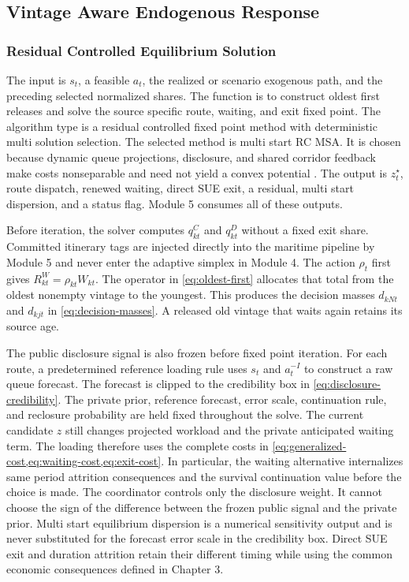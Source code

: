 \documentclass[a4paper,fleqn]{cas-sc}
\begin{document}
\subsection{Vintage Aware Endogenous Response}
\label{subsec:rcmsa}

\subsubsection{Residual Controlled Equilibrium Solution}
The input is $s_t$, a feasible $a_t$, the realized or scenario exogenous path,
and the preceding selected normalized shares. The function is to construct
oldest first releases and solve the source specific route, waiting, and exit
fixed point. The algorithm type is a residual controlled fixed point method
with deterministic multi solution selection. The selected method is multi
start RC MSA. It is chosen because dynamic queue projections, disclosure, and
shared corridor feedback make costs nonseparable and need not yield a convex
potential \citep{MounceCarey2015,Maher1998}. The output is $z_t^\star$, route
dispatch, renewed waiting, direct SUE exit, a residual, multi start dispersion,
and a status flag. Module 5 consumes all of these outputs.

Before iteration, the solver computes $q^C_{kt}$ and $q^D_{kt}$ without a fixed
exit share. Committed itinerary tags are injected directly into the maritime
pipeline by Module 5 and never enter the adaptive simplex in Module 4. The
action $\rho_t$ first gives
$R^W_{kt}=\rho_{kt}W_{kt}$. The operator in \cref{eq:oldest-first} allocates
that total from the oldest nonempty vintage to the youngest. This produces the
decision masses $d_{kNt}$ and $d_{kjt}$ in \cref{eq:decision-masses}. A
released old vintage that waits again retains its source age.

The public disclosure signal is also frozen before fixed point iteration. For
each route, a predetermined reference loading rule uses $s_t$ and $a_t^{-I}$
to construct a raw queue forecast. The forecast is clipped to the credibility
box in \cref{eq:disclosure-credibility}. The private prior, reference forecast,
error scale, continuation rule, and reclosure probability are held fixed
throughout the solve. The current candidate $z$ still changes projected
workload and the private anticipated waiting term. The loading therefore uses
the complete costs in
\cref{eq:generalized-cost,eq:waiting-cost,eq:exit-cost}. In particular, the
waiting alternative internalizes same period attrition consequences and the
survival continuation value before the choice is made.
The coordinator controls only the disclosure weight. It cannot choose the sign
of the difference between the frozen public signal and the private prior.
Multi start equilibrium dispersion is a numerical sensitivity output and is
never substituted for the forecast error scale in the credibility box. Direct
SUE exit and duration attrition retain their different timing while using the
common economic consequences defined in Chapter 3.
\end{document}
